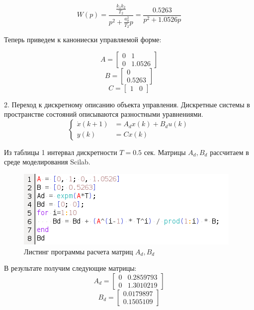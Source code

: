 \documentclass[a4paper,14pt]{extreport}
\begin{document}
\begin{equation}
W(p) = \frac{\frac{k_1 k_2}{T_2}}{p^2 + \frac{a_0^2}{T_2} p} = \frac{0.5263}{p^2 + 1.0526  p} 
\end{equation}

Теперь приведем к канониески управляемой форме:

\begin{equation}
	A=
	\begin{bmatrix}
	0&1\\
	0& 1.0526
	\end{bmatrix}
\end{equation}
\begin{equation}
B=
\begin{bmatrix}
0\\
0.5263
\end{bmatrix}
\end{equation}
\begin{equation}
C=
\begin{bmatrix}
1&0
\end{bmatrix}
\end{equation}

2. Переход к дискретному описанию объекта управления.
Дискретные системы в пространстве состояний описываются разностными уравнениями.
\begin{equation}
\begin{cases}
\dot x(k+1) &= A_d x(k) + B_d u(k)\\
y(k) &= C x(k)
\end{cases}
\end{equation}

Из таблицы 1 интервал дискретности $T = 0.5$ сек.
Матрицы $A_d, B_d$ рассчитаем в среде моделирования Scilab.
\begin{figure}[H]
	\center\includegraphics[width=0.5\linewidth]{adbd.png}
	\caption{Листинг программы расчета матриц $A_d, B_d$}
	\label{fig:scr1}
\end{figure}
В результате получим следующие матрицы:
\begin{equation}
A_d=
\begin{bmatrix}
0&0.2859793\\
0& 1.3010219
\end{bmatrix}
\end{equation}
\begin{equation}
B_d=
\begin{bmatrix}
0.0179897\\
0.1505109
\end{bmatrix}
\end{equation}
\end{document}
